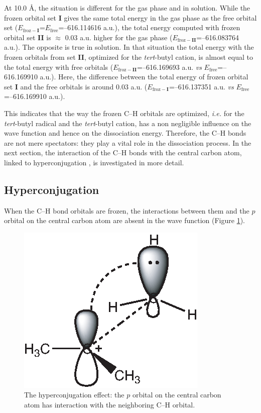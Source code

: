 At 10.0 \AA, the situation is different for the gas phase and in solution. While the frozen orbital set \textbf{I} gives the same total energy in the gas phase as the free orbital set ($E_{\mathrm{froz}-\textbf{I}}$=$E_\mathrm{free}$=--616.114616 a.u.), the total energy computed with frozen orbital set \textbf{II} is $\approx$ 0.03 a.u. higher for the gas phase ($E_{\mathrm{froz}-\textbf{II}}$=--616.083764 a.u.). The opposite is true in solution. In that situation the total energy with the frozen orbitals from set \textbf{II}, optimized for the \textit{tert}-butyl cation, is almost equal to the total energy with free orbitals ($E_{\mathrm{froz}-\textbf{II}}$=--616.169693 a.u. \textit{vs} $E_\mathrm{free}$=--616.169910 a.u.). Here, the difference between the total energy of frozen orbital set \textbf{I} and the free orbitals is around 0.03 a.u. ($E_{\mathrm{froz}-\textbf{I}}$=--616.137351 a.u. \textit{vs} $E_\mathrm{free}$=--616.169910 a.u.).

This indicates that the way the frozen C--H orbitals are optimized, \textit{i.e.} for the \textit{tert}-butyl radical and the \textit{tert}-butyl cation, has a non negligible influence on the wave function and hence on the dissociation energy. Therefore, the C--H bonds are not mere spectators: they play a vital role in the dissociation process. In the next section, the interaction of the C--H bonds with the central carbon atom, linked to hyperconjugation \cite{march,mcmurry}, is investigated in more detail.
 
\subsection{Hyperconjugation}

When the C--H bond orbitals are frozen, the interactions between them and the $p$ orbital on the central carbon atom are absent in the wave function (Figure \ref{ch3.fig.hyperconjugation}).
\begin{figure}[ht]
\center
\includegraphics{dissociation/figures/hyperconj.eps}
\caption{The hyperconjugation effect: the $p$ orbital on the central carbon atom has interaction with the neighboring C--H orbital.}
\label{ch3.fig.hyperconjugation}
\end{figure}

